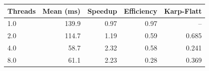 \begin{tabular}{lrrrr}
\toprule
Threads & Mean (ms) & Speedup & Efficiency & Karp-Flatt \\
\midrule
1.0 & 139.9 & 0.97 & 0.97 & -- \\
2.0 & 114.7 & 1.19 & 0.59 & 0.685 \\
4.0 & 58.7 & 2.32 & 0.58 & 0.241 \\
8.0 & 61.1 & 2.23 & 0.28 & 0.369 \\
\bottomrule
\end{tabular}
